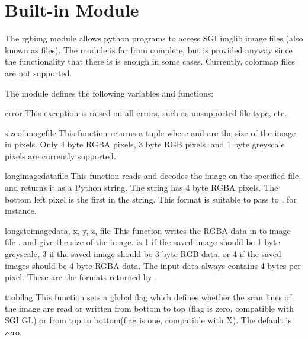 \section{Built-in Module }
\label{module-rgbimg}

The rgbimg module allows python programs to access SGI imglib image
files (also known as  files).  The module is far from
complete, but is provided anyway since the functionality that there is
is enough in some cases.  Currently, colormap files are not supported.

The module defines the following variables and functions:

\begin{excdesc}{error}
This exception is raised on all errors, such as unsupported file type, etc.
\end{excdesc}

\begin{funcdesc}{sizeofimage}{file}
This function returns a tuple  where
 and  are the size of the image in pixels.
Only 4 byte RGBA pixels, 3 byte RGB pixels, and 1 byte greyscale pixels
are currently supported.
\end{funcdesc}

\begin{funcdesc}{longimagedata}{file}
This function reads and decodes the image on the specified file, and
returns it as a Python string. The string has 4 byte RGBA pixels.
The bottom left pixel is the first in
the string. This format is suitable to pass to ,
for instance.
\end{funcdesc}

\begin{funcdesc}{longstoimage}{data, x, y, z, file}
This function writes the RGBA data in  to image
file .  and  give the size of the image.
 is 1 if the saved image should be 1 byte greyscale, 3 if the
saved image should be 3 byte RGB data, or 4 if the saved images should
be 4 byte RGBA data.  The input data always contains 4 bytes per pixel.
These are the formats returned by .
\end{funcdesc}

\begin{funcdesc}{ttob}{flag}
This function sets a global flag which defines whether the scan lines
of the image are read or written from bottom to top (flag is zero,
compatible with SGI GL) or from top to bottom(flag is one,
compatible with X)\@.  The default is zero.
\end{funcdesc}

